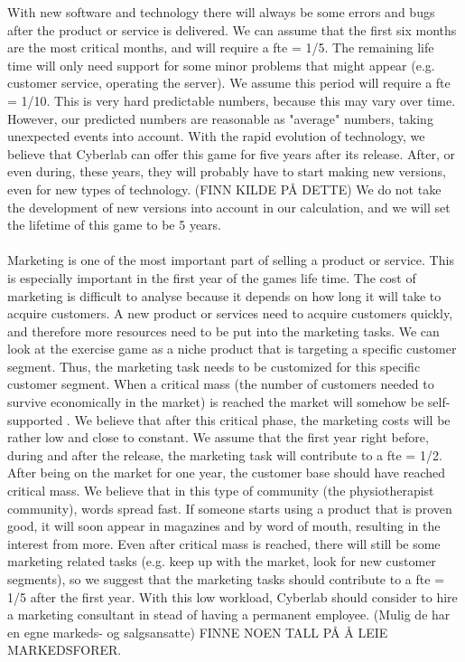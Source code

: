 With new software and technology there will always be some errors and bugs after the product or service is delivered. We can assume that the first six months are the most critical months, and will require a \ac{fte} = 1/5. The remaining life time will only need support for some minor problems that might appear (e.g. customer service, operating the server). We assume this period will require a \ac{fte} = 1/10. This is very hard predictable numbers, because this may vary over time. However, our predicted numbers are reasonable as "average" numbers, taking unexpected events into account. With the rapid evolution of technology, we believe that Cyberlab can offer this game for five years after its release. After, or even during, these years, they will probably have to start making new versions, even for new types of technology. (FINN KILDE PÅ DETTE) We do not take the development of new versions into account in our calculation, and we will set the lifetime of this game to be 5 years. \\ \\
Marketing is one of the most important part of selling a product or service. This is especially important in the first year of the games life time. The cost of marketing is difficult to analyse because it depends on how long it will take to acquire customers. A new product or services need to acquire customers quickly, and therefore more resources need to be put into the marketing tasks. We can look at the exercise game as a niche product that is targeting a specific customer segment. Thus, the marketing task needs to be customized for this specific customer segment. When a critical mass (the number of customers needed to survive economically in the market) is reached the market will somehow be self-supported \cite{informationrules}. We believe that after this critical phase, the marketing costs will be rather low and close to constant. We assume that the first year right before, during and after the release, the marketing task will contribute to a \ac{fte} = 1/2. After being on the market for one year, the customer base should have reached critical mass.  We believe that in this type of community (the physiotherapist community), words spread fast. If someone starts using a product that is proven good, it will soon appear in magazines and by word of mouth, resulting in the interest from more. Even after critical mass is reached, there will still be some marketing related tasks (e.g. keep up with the market, look for new customer segments), so we suggest that the marketing tasks should contribute to a \ac{fte} = 1/5 after the first year. With this low workload, Cyberlab should consider to hire a marketing consultant in stead of having a permanent employee. (Mulig de har en egne markeds- og salgsansatte) FINNE NOEN TALL PÅ Å LEIE MARKEDSFORER.\\ \\
